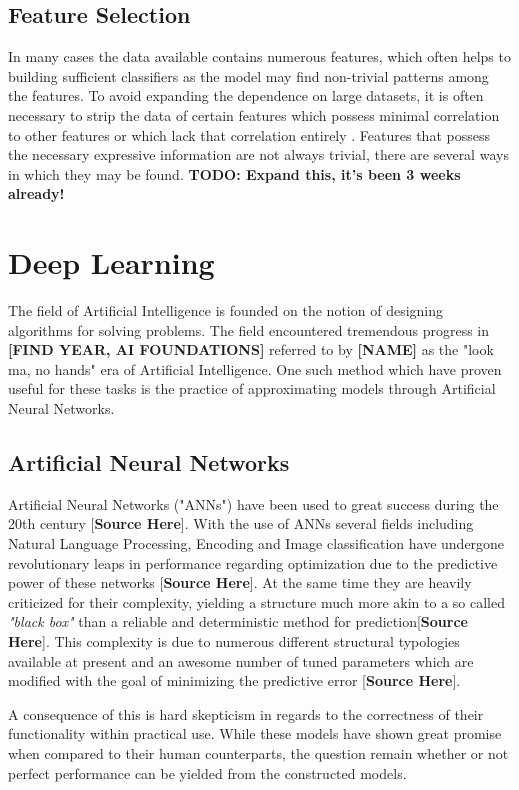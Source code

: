 \subsection{Feature Selection}

In many cases the data available contains numerous features, which often helps to building sufficient classifiers as the model may find non-trivial patterns among the features. To avoid expanding the dependence on large datasets, it is often necessary to strip the data of certain features which possess minimal correlation to other features or which lack that correlation entirely \cite{dash1997feature}. Features that possess the necessary expressive information are not always trivial, there are several ways in which they may be found. \textbf{TODO: Expand this, it's been 3 weeks already!}


\section{Deep Learning}

The field of Artificial Intelligence is founded on the notion of designing algorithms for solving problems. The field encountered tremendous progress in \textbf{[FIND YEAR, AI FOUNDATIONS]} referred to by \textbf{[NAME]} as the "look ma, no hands" era of Artificial Intelligence. One such method which have proven useful for these tasks is the practice of approximating models through Artificial Neural Networks.

\subsection{Artificial Neural Networks}
Artificial Neural Networks ("ANNs") have been used to great success during the 20th century [\textbf{Source Here}]. With the use of ANNs
several fields including Natural Language Processing, Encoding and Image classification have undergone revolutionary leaps in performance regarding optimization due to the predictive power of these networks [\textbf{Source Here}]. At the same time they are heavily criticized for their complexity, yielding a structure much more akin to a so called \textit{"black box"} than a reliable and deterministic method for prediction[\textbf{Source Here}]. This complexity is due to numerous different structural typologies available at present and an awesome number of tuned parameters which are modified with the goal of minimizing the predictive error [\textbf{Source Here}].

A consequence of this is hard skepticism in regards to the correctness of their functionality within practical use. While these models have shown great promise when compared to their human counterparts, the question remain whether or not perfect performance can be yielded from the constructed models.\\

